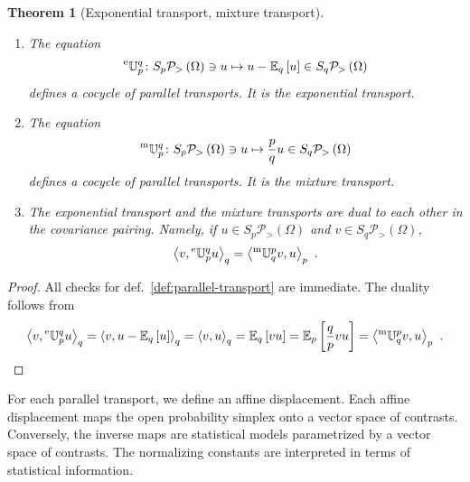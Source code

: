 \documentclass[axioms,article,submit,pdftex,moreauthors]{Definitions/mdpi}
\theoremstyle{plain}
\newtheorem{theo}{Theorem}
\theoremstyle{remark}
\newcommand{\Expectation}{\mathbb E}
\newcommand{\etransport}[2]{\prescript{\text{e}}{} {\mathbb U} _ {#1} ^ {#2}}
\newcommand{\expectat}[2]{\Expectation_{#1}\left[#2\right]}
\newcommand{\expfibreat}[2]{S_{#1}\pdensitieson{#2}}
\newcommand{\mtransport}[2]{\prescript{\text{m}}{} {\mathbb U} _ {#1} ^ {#2}}
\newcommand{\pdensitieson}[1]{\mathcal P_{>}\left(#1\right)}
\newcommand{\scalarat}[3]{\left\langle#2,#3\right\rangle_{#1}}
\begin{document}
\begin{theo}[Exponential transport, mixture transport] \label{theo:transports}
\begin{enumerate}\ 
    \item \label{item:transport-e}The equation
    \begin{equation*}
        \etransport p q \colon \expfibreat p \Omega \ni u \mapsto u - \expectat q u \in \expfibreat q \Omega
    \end{equation*}
defines a cocycle of parallel transports. It is the \emph{exponential transport}.
\item \label{item:transport-m}
 The equation
    \begin{equation*}
        \mtransport p q \colon \expfibreat p \Omega \ni u \mapsto \frac p q u \in \expfibreat q \Omega
    \end{equation*}
defines a cocycle of parallel transports. It is the \emph{mixture transport}.
\item \label{item:transport-e-m}
The exponential transport and the mixture transports are dual to each other in the covariance pairing. Namely, if $u \in \expfibreat p \Omega$ and $v \in \expfibreat q \Omega$,
\begin{equation*}
    \scalarat q v {\etransport p q u} = \scalarat p {\mtransport q p v} u \ .
\end{equation*}
\end{enumerate}
\end{theo}

\begin{proof}
 All checks for def.~\ref{def:parallel-transport} are immediate. The duality follows from 
 \begin{equation*}
 \scalarat q v {\etransport p q u} = \scalarat q v {u - \expectat q u} = \scalarat q v u =  \\
 \expectat q {vu} = \expectat p {\frac q p vu} = \scalarat p {\mtransport q p v} u \ .
 \end{equation*}
\end{proof}

For each parallel transport, we define an affine displacement. Each affine displacement maps the open probability simplex onto a vector space of contrasts. Conversely, the inverse maps are statistical models parametrized by a vector space of contrasts. The normalizing constants are interpreted in terms of statistical information.
\end{document}
